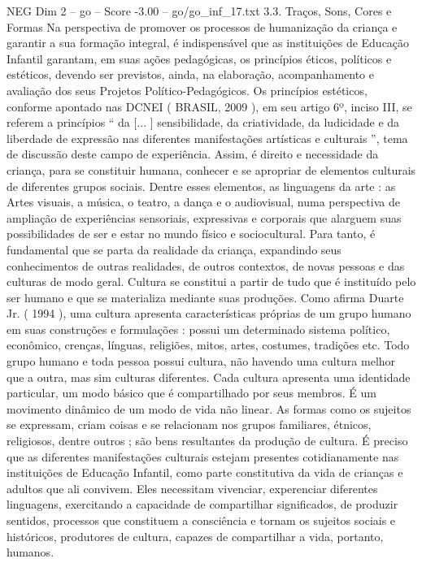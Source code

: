 \begin{textsample}{NEG Dim 2 – go – Score -3.00 – go/go\_inf\_17.txt}  \label{ex:f2_neg_114}
3.3.
Traços, Sons, Cores e Formas Na perspectiva de promover os processos de humanização da criança e garantir a sua formação integral, é indispensável que as instituições de Educação Infantil garantam, em suas ações pedagógicas, os princípios éticos, políticos e estéticos, devendo ser previstos, ainda, na elaboração, acompanhamento e avaliação dos seus Projetos Político-Pedagógicos.
Os princípios estéticos, conforme apontado nas DCNEI ( BRASIL, 2009 ), em seu artigo 6º, inciso III, se referem a princípios “ da [... ] sensibilidade, da criatividade, da ludicidade e da liberdade de expressão nas diferentes manifestações artísticas e culturais ”, tema de discussão deste campo de experiência.
Assim, é direito e necessidade da criança, para se constituir humana, conhecer e se apropriar de elementos culturais de diferentes grupos sociais.
Dentre esses elementos, as linguagens da arte : as Artes visuais, a música, o teatro, a dança e o audiovisual, numa perspectiva de ampliação de experiências sensoriais, expressivas e corporais que alarguem suas possibilidades de ser e estar no mundo físico e sociocultural.
Para tanto, é fundamental que se parta da realidade da criança, expandindo seus conhecimentos de outras realidades, de outros contextos, de novas pessoas e das culturas de modo geral.
Cultura se constitui a partir de tudo que é instituído pelo ser humano e que se materializa mediante suas produções.
Como afirma Duarte Jr. ( 1994 ), uma cultura apresenta características próprias de um grupo humano em suas construções e formulações : possui um determinado sistema político, econômico, crenças, línguas, religiões, mitos, artes, costumes, tradições etc.
Todo grupo humano e toda pessoa possui cultura, não havendo uma cultura melhor que a outra, mas sim culturas diferentes.
Cada cultura apresenta uma identidade particular, um modo básico que é compartilhado por seus membros.
É um movimento dinâmico de um modo de vida não linear.
As formas como os sujeitos se expressam, criam coisas e se relacionam nos grupos familiares, étnicos, religiosos, dentre outros ; são bens resultantes da produção de cultura.
É preciso que as diferentes manifestações culturais estejam presentes cotidianamente nas instituições de Educação Infantil, como parte constitutiva da vida de crianças e adultos que ali convivem.
Eles necessitam vivenciar, experenciar diferentes linguagens, exercitando a capacidade de compartilhar significados, de produzir sentidos, processos que constituem a consciência e tornam os sujeitos sociais e históricos, produtores de cultura, capazes de compartilhar a vida, portanto, humanos.

\end{textsample}
